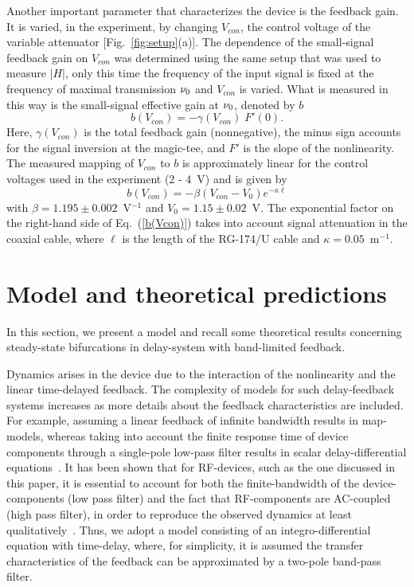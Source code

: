 \documentclass[aps,twocolumn,pre,nofootinbib]{revtex4}
\begin{document}
Another important parameter that characterizes the device is the feedback gain. It is varied, in the experiment, by changing  $V_{con}$, the control voltage of the variable attenuator [Fig.~\ref{fig:setup}(a)]. 
The dependence of the small-signal feedback gain on $V_{con}$ was determined using the same setup that was used to measure $|H|$, only this time the frequency of the input signal is fixed at the frequency of maximal transmission $\nu_0$ and $V_{con}$ is varied. What is measured in this way is the small-signal effective gain at $\nu_0$, denoted by $b$
\begin{equation}
b(V_{con}) = - \gamma(V_{con})\; F'(0).
\label{b_def}
\end{equation}
Here, $\gamma(V_{con})$ is the total feedback gain (nonnegative), the minus sign accounts for the signal inversion at the magic-tee, and $F'$ is the slope of the nonlinearity. 
 The measured mapping of $V_{con}$ to $b$ is approximately linear for the control voltages used in the experiment (2 - 4~V) and is given by
\begin{equation}
b(V_{con}) = - \beta \left(V_{con} - V_0 \right) e^{ - \kappa \ell }
\label{b(Vcon)}
\end{equation}
with $\beta = 1.195 \pm 0.002$~V$^{-1}$ and $V_0 = 1.15 \pm 0.02$~V. 
The exponential factor on the right-hand side of Eq.~(\ref{b(Vcon)}) takes into account signal attenuation in the coaxial cable, where $\ell$ is the length of the RG-174/U cable and $\kappa =0.05$~m$^{-1}$.

 


\section{Model and theoretical predictions}


In this section, we present a model and recall some theoretical results concerning steady-state bifurcations in delay-system with band-limited feedback. 

Dynamics arises in the device due to the interaction of the nonlinearity and the linear time-delayed feedback.
The complexity of models for such delay-feedback systems increases as more details about the feedback characteristics are included. For example, assuming a linear feedback of infinite bandwidth results in map-models, whereas taking into account the finite response time of device components through a single-pole low-pass filter results in scalar delay-differential equations~\cite{Ikeda1982,Celka1997}.
  It has been shown that for RF-devices, such as the one discussed in this paper, it is essential to account for both the finite-bandwidth of the device-components (low pass filter) and the fact that RF-components are AC-coupled (high pass filter), in order to reproduce the observed dynamics at least qualitatively~\cite{Blakely2004QE,illing2005,Udaltsov2002}.
 Thus, we adopt a model consisting of an integro-differential equation with time-delay, where, for simplicity, it is assumed the transfer characteristics of the feedback can be approximated by a two-pole band-pass filter.
 
\end{document}
